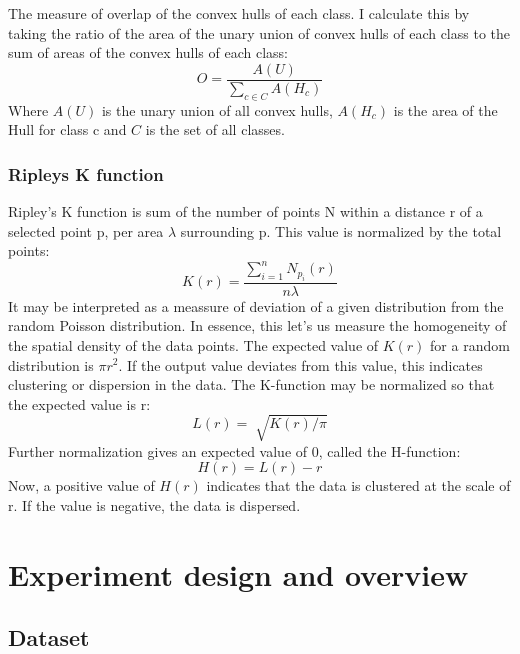 \documentclass[11pt]{article}
\begin{document}
The measure of overlap of the convex hulls of each class. I calculate this by taking the ratio of the area of the unary union of convex hulls of each class to the sum of areas of the convex hulls of each class:
\[ O = \frac{A(U)}{\sum_{c \in C}A(H_{c})} \]
Where \(A(U)\) is the unary union of all convex hulls, \(A(H_{c})\) is the area of the Hull for class c and \(C\) is the set of all classes.
\subsubsection{Ripleys K function}
\label{sec:org533d625}

Ripley's K function is sum of the number of points N within a distance r of a selected point p, per area \(\lambda\) surrounding p. This  value is normalized by the total points:
\[K(r) = \frac{\sum_{i=1}^{n}N_{p_{i}}(r)}{n \lambda}\]
It may be interpreted as a meassure of deviation of a given distribution from the random Poisson distribution. In essence, this let's us measure the homogeneity of the spatial density of the data points. The expected value of \(K(r)\) for a random distribution is \(\pi r^{2}\). If the output value deviates from this value, this indicates clustering or dispersion in the data. The K-function may be normalized so that the expected value is r:
\[L(r) = \sqrt[]{K(r)/\pi}\]
Further normalization gives an expected value of 0, called the H-function:
\[H(r) = L(r) - r\]
Now, a positive value of \(H(r)\) indicates that the data is clustered at the scale of r. If the value is negative, the data is dispersed.

\section{Experiment design and overview}
\label{sec:orga220b5b}
\subsection{Dataset}
\label{sec:orgac308b8}
\end{document}

